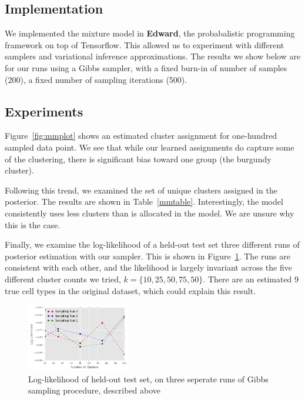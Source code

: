 \documentclass{article}
\begin{document}
\subsection{Implementation} 
We implemented the mixture model in \textbf{Edward}, the probabalistic programming framework on top of Tensorflow. This allowed us to experiment with different samplers and variational inference approximations. The results we show below are for our runs using a Gibbs sampler, with a fixed burn-in of number of samples (200), a fixed number of sampling iterations (500).

\subsection{Experiments}  

Figure~\ref{fig:mmplot} shows an estimated cluster assignment for one-hundred sampled data point. We see that while our learned assignments do capture some of the clustering, there is significant bias toward one group (the burgundy cluster).

Following this trend, we examined the set of unique clusters assigned in the posterior. The results are shown in Table~\ref{mmtable}. Interestingly, the model consistently uses less clusters than is allocated in the model. We are unsure why this is the case.

Finally, we examine the log-likelihood of a held-out test set three different runs of posterior estimation with our sampler. This is shown in Figure~\ref{fig:llmm}. The runs are consistent with each other, and the likelihood is largely invariant across the five different cluster counts we tried, $k=\{10,25,50,75,50\}$. There are an estimated 9 true cell types in the original dataset, which could explain this result.

\begin{figure}[h]
    \centering
    \includegraphics[width=0.4\textwidth]{figs/llmm}
    \caption{Log-likelihood of held-out test set, on three seperate runs of Gibbs sampling procedure, described above}
    \label{fig:llmm}
\end{figure}
\end{document}
